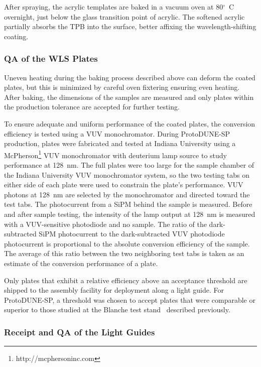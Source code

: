 After spraying, the acrylic templates are baked in a vacuum oven at 80$^{\circ}$~C overnight, just below the glass transition point of acrylic. The softened acrylic partially absorbs the TPB into the surface, better affixing the wavelength-shifting coating.


\subsubsection{QA of the WLS Plates}

Uneven heating during the baking process described above can deform the coated plates, but this is minimized by careful oven fixtering ensuring even heating. After baking, the dimensions of the samples are measured and only plates within the production tolerance are accepted for further testing.

To ensure adequate and uniform performance of the coated plates, the conversion efficiency is tested using a VUV monochromator. During ProtoDUNE-SP production, plates were fabricated and tested at Indiana University using a McPherson\footnote{http://mcphersoninc.com} VUV monochromator with deuterium lamp source to study performance at 128~nm. The full plates were too large for the sample chamber of the Indiana University VUV monochromator system, so the two testing tabs on either side of each plate were used to constrain the plate's performance. VUV photons at 128~nm are selected by the monochromator and directed toward the test tabs. The photocurrent from a SiPM behind the sample is measured. Before and after sample testing, the intensity of the lamp output at 128~nm is measured with a VUV-sensitive photodiode and no sample. The ratio of the dark-subtracted SiPM photocurrent to the dark-subtracted VUV photodiode photocurrent is proportional to the absolute conversion efficiency of the sample. The average of this ratio between the two neighboring test tabs is taken as an estimate of the conversion performance of a plate.

Only plates that exhibit a relative efficiency above an acceptance threshold are shipped to the assembly facility for deployment along a light guide. For ProtoDUNE-SP, a threshold was chosen to accept plates that were comparable or superior to those studied at the Blanche test stand~\cite{bib:DoubleShiftLG-NIM-171113} described previously.

\subsubsection{Receipt and QA of the Light Guides}

